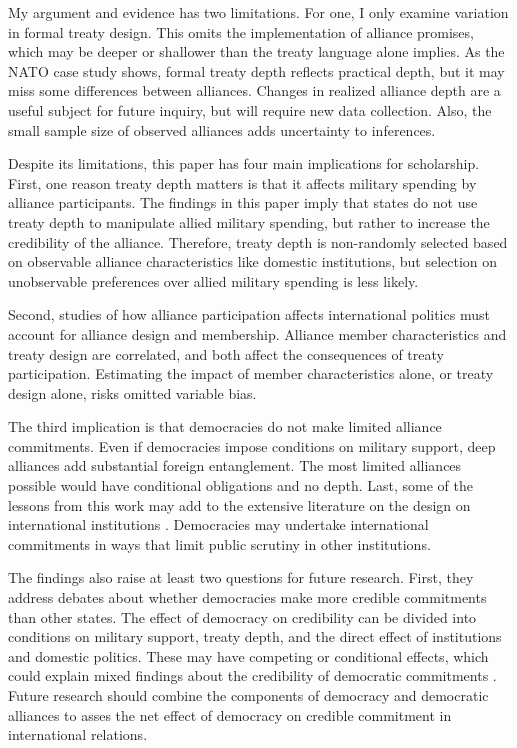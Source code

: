 \documentclass[12pt]{article}
\begin{document}
My argument and evidence has two limitations. 
For one, I only examine variation in formal treaty design. 
This omits the implementation of alliance promises, which may be deeper or shallower than the treaty language alone implies. 
As the NATO case study shows, formal treaty depth reflects practical depth, but it may miss some differences between alliances. 
Changes in realized alliance depth are a useful subject for future inquiry, but will require new data collection.
Also, the small sample size of observed alliances adds uncertainty to inferences.  


Despite its limitations, this paper has four main implications for scholarship. 
First, one reason treaty depth matters is that it affects military spending by alliance participants.
The findings in this paper imply that states do not use treaty depth to manipulate allied military spending, but rather to increase the credibility of the alliance. 
Therefore, treaty depth is non-randomly selected based on observable alliance characteristics like domestic institutions, but selection on unobservable preferences over allied military spending is less likely. 


Second, studies of how alliance participation affects international politics must account for alliance design and membership. 
Alliance member characteristics and treaty design are correlated, and both affect the consequences of treaty participation.   
Estimating the impact of member characteristics alone, or treaty design alone, risks omitted variable bias. 


The third implication is that democracies do not make limited alliance commitments. 
Even if democracies impose conditions on military support, deep alliances add substantial foreign entanglement.
The most limited alliances possible would have conditional obligations and no depth.  
Last, some of the lessons from this work may add to the extensive literature on the design on international institutions \citep{DownesRocke1995, MartinSimmons1998, Koremenosetal2001, Koremenos2005, Thompson2010}.
Democracies may undertake international commitments in ways that limit public scrutiny in other institutions. 


The findings also raise at least two questions for future research.  
First, they address debates about whether democracies make more credible commitments than other states. 
The effect of democracy on credibility can be divided into conditions on military support, treaty depth, and the direct effect of institutions and domestic politics. 
These may have competing or conditional effects, which could explain mixed findings about the credibility of democratic commitments \citep{Schultz1999, Leeds1999, Thyne2012, DownesSechser2012}.
Future research should combine the components of democracy and democratic alliances to asses the net effect of democracy on credible commitment in international relations. 
\end{document}
